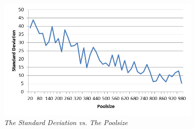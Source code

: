 \begin{figure}[H] 
	\centering
	\includegraphics[height=6cm]{SDP}
	\caption{\textsl{The Standard Deviation vs. The Poolsize}}
	\label{SDP}
\end{figure}


